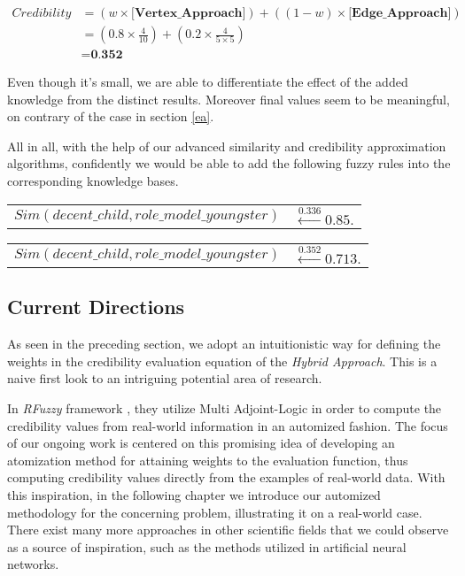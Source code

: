 \documentclass[egilmezThesis.tex]{subfiles}
\begin{document}
 \begin{equation}
\begin{split}
\textit{Credibility} &= (w \times  \textbf{[Vertex\_Approach]}) + ((1-w) \times  \textbf{[Edge\_Approach]}) \\
&= (0.8 \times \frac{4}{10}) + (0.2 \times \frac{4}{5 \times 5}) \\
&= \textbf{0.352} 
\end{split}
\end{equation}

Even though it's small, we are able to differentiate the effect of the added knowledge from the distinct results. Moreover final values seem to be meaningful, on contrary of the case in section \ref{ea}.

All in all, with the help of our advanced similarity and credibility approximation algorithms, confidently we would be able to add the following fuzzy rules into the corresponding knowledge bases.

\begin{tabular}{l l}
$Sim(decent\_child, role\_model\_youngster)$ & $\stackrel{0.336}{\longleftarrow} 0.85.$\\
\end{tabular}

\begin{tabular}{l l}
$Sim(decent\_child, role\_model\_youngster)$ & $\stackrel{0.352}{\longleftarrow} 0.713.$\\
\end{tabular}


\subsection{Current Directions}
\label{fd}

As seen in the preceding section, we adopt an intuitionistic way for defining the weights in the credibility evaluation equation of the \textit{Hybrid Approach}. This is a naive first look to an intriguing potential area of research. 

In \textit{RFuzzy} framework \cite{MPS10}, they utilize Multi Adjoint-Logic in order to compute the credibility values from real-world information in an automized fashion. The focus of our ongoing work is centered on this promising idea of developing an atomization method for attaining weights to the evaluation function, thus computing credibility values directly from the examples of real-world data. With this inspiration, in the following chapter we introduce our automized methodology for the concerning problem, illustrating it on a real-world case. There exist many more approaches in other scientific fields that we could observe as a source of inspiration, such as the methods utilized in artificial neural networks. 
 
 
\end{document}
